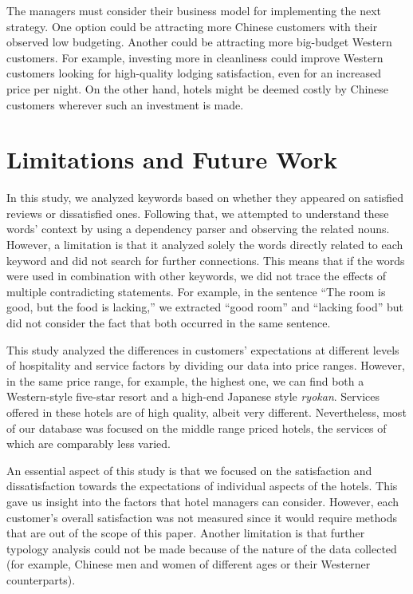 \documentclass[smallextended,natbib]{svjour3}       %
\begin{document}
    The managers must consider their business model for implementing the next strategy. One option could be attracting more Chinese customers with their observed low budgeting. Another could be attracting more big-budget Western customers. For example, investing more in cleanliness could improve Western customers looking for high-quality lodging satisfaction, even for an increased price per night. On the other hand, hotels might be deemed costly by Chinese customers wherever such an investment is made.

\section{Limitations and Future Work}\label{limitations}

  In this study, we analyzed keywords based on whether they appeared on satisfied reviews or dissatisfied ones. Following that, we attempted to understand these words' context by using a dependency parser and observing the related nouns. However, a limitation is that it analyzed solely the words directly related to each keyword and did not search for further connections. This means that if the words were used in combination with other keywords, we did not trace the effects of multiple contradicting statements. For example, in the sentence ``The room is good, but the food is lacking,'' we extracted ``good room'' and ``lacking food'' but did not consider the fact that both occurred in the same sentence.

  This study analyzed the differences in customers' expectations at different levels of hospitality and service factors by dividing our data into price ranges. However, in the same price range, for example, the highest one, we can find both a Western-style five-star resort and a high-end Japanese style \textit{ryokan}. Services offered in these hotels are of high quality, albeit very different. Nevertheless, most of our database was focused on the middle range priced hotels, the services of which are comparably less varied. 

  An essential aspect of this study is that we focused on the satisfaction and dissatisfaction towards the expectations of individual aspects of the hotels. This gave us insight into the factors that hotel managers can consider. However, each customer's overall satisfaction was not measured since it would require methods that are out of the scope of this paper. Another limitation is that further typology analysis could not be made because of the nature of the data collected (for example, Chinese men and women of different ages or their Westerner counterparts).
\end{document}
